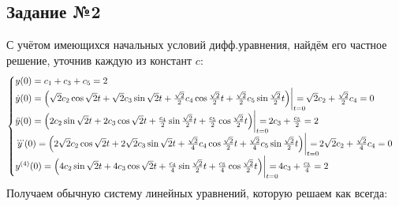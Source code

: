 \documentclass[a3paper,14pt]{extarticle}
\newcommand{\at}{\biggr\rvert}
\newcommand{\shiftright}[3]{\makebox[#2][r]{\makebox[#1][l]{#3}}}
\begin{document}
\subsection*{\centering Задание №2}
С учётом имеющихся начальных условий дифф.уравнения, найдём его частное решение, уточнив каждую из констант $c$:
$$\begin{cases}
    y(0) = c_1 + c_3 + c_5 = 2 \\
    \dot{y}(0) = \left(\sqrt{2}c_2\cos\sqrt{2}t + \sqrt{2}c_3\sin\sqrt{2}t + \frac{\sqrt{2}}{2}c_4\cos\frac{\sqrt{2}}{2}t + \frac{\sqrt{2}}{2}c_5\sin\frac{\sqrt{2}}{2}t\right)\at_{t=0}\shiftright{1em}{0em}{=}\sqrt{2}c_2+\frac{\sqrt{2}}{2}c_4=0 \\
    \ddot{y}(0) = \left(2c_2\sin\sqrt{2}t + 2c_3\cos\sqrt{2}t + \frac{c_4}{2}\sin\frac{\sqrt{2}}{2}t + \frac{c_5}{2}\cos\frac{\sqrt{2}}{2}t\right)\at_{t=0}\shiftright{1em}{0em}{=}2c_3+\frac{c_5}{2} = 2 \\
    \dddot{y}(0) = \left(2\sqrt{2}c_2\cos\sqrt{2}t + 2\sqrt{2}c_3\sin\sqrt{2}t + \frac{\sqrt{2}}{4}c_4\cos\frac{\sqrt{2}}{2}t + \frac{\sqrt{2}}{4}c_5\sin\frac{\sqrt{2}}{2}t\right)\at_{t=0}\shiftright{1em}{0em}{=}2\sqrt{2}c_2+\frac{\sqrt{2}}{4}c_4=0 \\
    y^{(4)}(0) = \left(4c_2\sin\sqrt{2}t + 4c_3\cos\sqrt{2}t + \frac{c_4}{4}\sin\frac{\sqrt{2}}{2}t + \frac{c_5}{4}\cos\frac{\sqrt{2}}{2}t\right)\at_{t=0}\shiftright{1em}{0em}{=} 4c_3 + \frac{c_5}{4} = 2
\end{cases}$$
Получаем обычную систему линейных уравнений, которую решаем как всегда:
\end{document}

